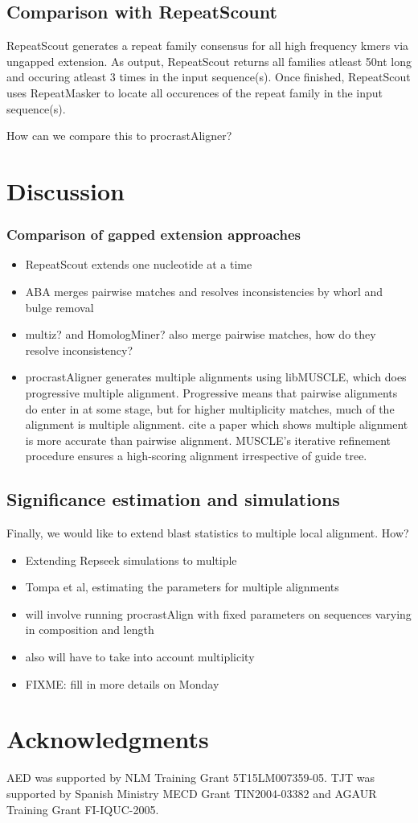 \documentclass{llncs}
\begin{document}
\subsection{Comparison with RepeatScount}

RepeatScout generates a repeat family consensus for all high frequency kmers via ungapped extension. As output, RepeatScout returns all families atleast 50nt long and occuring atleast 3 times in the input sequence(s). Once finished, RepeatScout uses RepeatMasker to locate all occurences of the repeat family in the input sequence(s).

How can we compare this to procrastAligner?


\section{Discussion}
\subsubsection{Comparison of gapped
extension approaches}


\begin{itemize}

\item RepeatScout extends one nucleotide at a time
\item ABA merges pairwise matches and resolves inconsistencies by
whorl and bulge removal
\item multiz? and HomologMiner? also merge pairwise matches, how do
they resolve inconsistency?
\item procrastAligner generates multiple alignments using libMUSCLE,
which does progressive multiple alignment.  Progressive means that
pairwise alignments do enter in at some stage, but for higher
multiplicity matches, much of the alignment is multiple alignment.
cite a paper which shows multiple alignment is more accurate than
pairwise alignment.  MUSCLE's iterative refinement procedure ensures
a high-scoring alignment irrespective of guide tree.

\end{itemize}


\subsection{Significance estimation and simulations}

Finally, we would like to extend blast statistics to multiple local alignment. How?
\begin{itemize}
\item Extending Repseek simulations to multiple
\item Tompa et al, estimating the parameters for multiple alignments
\item will involve running procrastAlign with fixed parameters on sequences varying in composition and length
\item also will have to take into account multiplicity
\item FIXME: fill in more details on Monday
\end{itemize}

\section{ Acknowledgments }
AED was supported by NLM Training Grant 5T15LM007359-05. TJT was
supported by Spanish Ministry MECD Grant TIN2004-03382 and AGAUR
Training Grant FI-IQUC-2005.


\small

\end{document}
